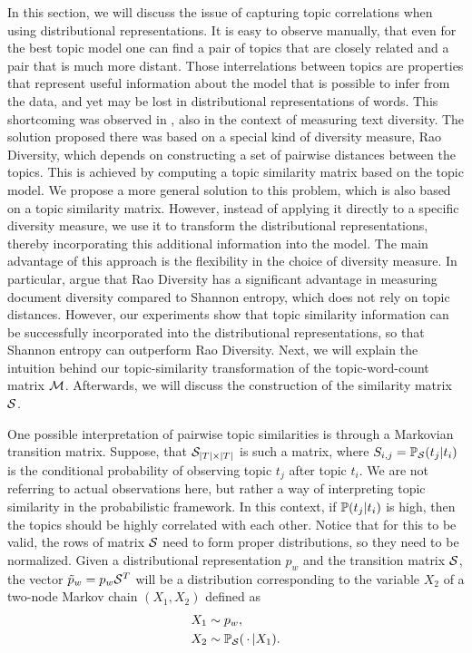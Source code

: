 In this section, we will discuss the issue of capturing topic
correlations when using distributional representations. It is easy to
observe manually, that even for the best topic model one can find a
pair of topics that are closely related and a pair that is much more
distant. Those interrelations between topics are 
properties that represent useful information about the model that is
possible to infer from the data, and yet
may be lost in distributional representations of words. 
This shortcoming was observed in \cite{bache:2013},
also in the context of measuring text diversity. The solution proposed
there was based on a special kind of diversity measure, Rao Diversity,
which depends on constructing a set of pairwise distances between the
topics. This is achieved by computing a topic similarity matrix based on
the topic model. We propose a more general solution to this problem,
which is also based on a topic similarity matrix. However, instead of
applying it directly to a specific diversity measure, we use it to
transform the distributional representations, thereby incorporating this
additional information into the model. The main advantage of this
approach is the flexibility in the choice of diversity measure. In
particular, \cite{bache:2013} argue that Rao Diversity has a
significant advantage in measuring document diversity compared to
Shannon entropy, which does not rely on topic distances. However, our
experiments show that topic similarity information can be successfully
incorporated into the distributional representations, so that Shannon
entropy can outperform Rao Diversity.  Next, we will explain the
intuition behind our topic-similarity transformation of the
topic-word-count matrix ${\mathcal M}$. Afterwards, we will discuss the
construction of the similarity matrix ${\mathcal S}$.

One possible interpretation of pairwise topic similarities is through
a Markovian transition matrix. Suppose, that ${\mathcal S}_{|T|\times|T|}$ is
such a matrix, where $S_{i,j}={\mathbb P}_{\mathcal S}(t_j|t_i)$ is the conditional
probability of observing topic $t_j$ after topic $t_i$. We are not
referring to actual observations here, but rather a way of interpreting
topic similarity in the probabilistic framework. In this context, if
${\mathbb P}(t_j|t_i)$ is high, then the topics should be highly correlated with
each other. Notice that for this to be valid, the rows of matrix ${\mathcal S}$
need to form proper distributions, so they need to be normalized.  
Given a distributional representation $p_w$ and the transition matrix
${\mathcal S}$, the vector $\tilde{p}_w=p_w {\mathcal S}^T$ will be a distribution
corresponding to the variable $X_2$ of a two-node Markov chain
$(X_1,X_2)$ defined as 
\begin{align*}
X_1&\sim p_w,\\
X_2&\sim {\mathbb P}_{\mathcal S}(\,\cdot\,|X_1).
\end{align*}

